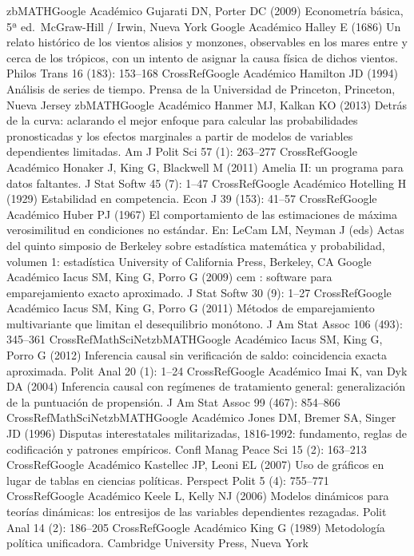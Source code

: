 \documentclass[
]{book}
\begin{document}
zbMATHGoogle Académico
Gujarati DN, Porter DC (2009) Econometría básica, 5ª ed.~McGraw-Hill / Irwin, Nueva York
Google Académico
Halley E (1686) Un relato histórico de los vientos alisios y monzones, observables en los mares entre y cerca de los trópicos, con un intento de asignar la causa física de dichos vientos. Philos Trans 16 (183): 153--168
CrossRefGoogle Académico
Hamilton JD (1994) Análisis de series de tiempo. Prensa de la Universidad de Princeton, Princeton, Nueva Jersey
zbMATHGoogle Académico
Hanmer MJ, Kalkan KO (2013) Detrás de la curva: aclarando el mejor enfoque para calcular las probabilidades pronosticadas y los efectos marginales a partir de modelos de variables dependientes limitadas. Am J Polit Sci 57 (1): 263--277
CrossRefGoogle Académico
Honaker J, King G, Blackwell M (2011) Amelia II: un programa para datos faltantes. J Stat Softw 45 (7): 1--47
CrossRefGoogle Académico
Hotelling H (1929) Estabilidad en competencia. Econ J 39 (153): 41--57
CrossRefGoogle Académico
Huber PJ (1967) El comportamiento de las estimaciones de máxima verosimilitud en condiciones no estándar. En: LeCam LM, Neyman J (eds) Actas del quinto simposio de Berkeley sobre estadística matemática y probabilidad, volumen 1: estadística University of California Press, Berkeley, CA
Google Académico
Iacus SM, King G, Porro G (2009) cem : software para emparejamiento exacto aproximado. J Stat Softw 30 (9): 1--27
CrossRefGoogle Académico
Iacus SM, King G, Porro G (2011) Métodos de emparejamiento multivariante que limitan el desequilibrio monótono. J Am Stat Assoc 106 (493): 345--361
CrossRefMathSciNetzbMATHGoogle Académico
Iacus SM, King G, Porro G (2012) Inferencia causal sin verificación de saldo: coincidencia exacta aproximada. Polit Anal 20 (1): 1--24
CrossRefGoogle Académico
Imai K, van Dyk DA (2004) Inferencia causal con regímenes de tratamiento general: generalización de la puntuación de propensión. J Am Stat Assoc 99 (467): 854--866
CrossRefMathSciNetzbMATHGoogle Académico
Jones DM, Bremer SA, Singer JD (1996) Disputas interestatales militarizadas, 1816-1992: fundamento, reglas de codificación y patrones empíricos. Confl Manag Peace Sci 15 (2): 163--213
CrossRefGoogle Académico
Kastellec JP, Leoni EL (2007) Uso de gráficos en lugar de tablas en ciencias políticas. Perspect Polit 5 (4): 755--771
CrossRefGoogle Académico
Keele L, Kelly NJ (2006) Modelos dinámicos para teorías dinámicas: los entresijos de las variables dependientes rezagadas. Polit Anal 14 (2): 186--205
CrossRefGoogle Académico
King G (1989) Metodología política unificadora. Cambridge University Press, Nueva York
\end{document}
